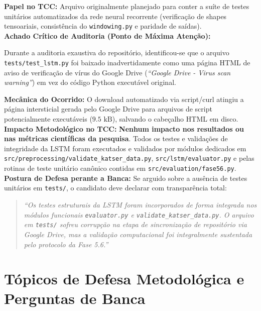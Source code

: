 \documentclass[10pt,a4paper]{article}
\begin{document}
\begin{filebox}
\textbf{Papel no TCC:} Arquivo originalmente planejado para conter a suíte de testes unitários automatizados da rede neural recorrente (verificação de shapes tensoariais, consistência do \texttt{windowing.py} e paridade de saídas).\\
\textbf{Achado Crítico de Auditoria (Ponto de Máxima Atenção):}
\begin{alertbox}
Durante a auditoria exaustiva do repositório, identificou-se que o arquivo \texttt{tests/test\_lstm.py} foi baixado inadvertidamente como uma página HTML de aviso de verificação de vírus do Google Drive (\textit{``Google Drive - Virus scan warning''}) em vez do código Python executável original.
\end{alertbox}
\textbf{Mecânica do Ocorrido:} O download automatizado via script/curl atingiu a página intersticial gerada pelo Google Drive para arquivos de script potencialmente executáveis ($9.5\text{ kB}$), salvando o cabeçalho HTML em disco.\\
\textbf{Impacto Metodológico no TCC:} \textbf{Nenhum impacto nos resultados ou nas métricas científicas da pesquisa}. Todos os testes e validações de integridade da LSTM foram executados e validados por módulos dedicados em \texttt{src/preprocessing/validate\_katser\_data.py}, \texttt{src/lstm/evaluator.py} e pelas rotinas de teste unitário canônico contidas em \texttt{src/evaluation/fase56.py}.\\
\textbf{Postura de Defesa perante a Banca:} Se arguido sobre a ausência de testes unitários em \texttt{tests/}, o candidato deve declarar com transparência total:
\begin{quote}
\textit{``Os testes estruturais da LSTM foram incorporados de forma integrada nos módulos funcionais \texttt{evaluator.py} e \texttt{validate\_katser\_data.py}. O arquivo em \texttt{tests/} sofreu corrupção na etapa de sincronização de repositório via Google Drive, mas a validação computacional foi integralmente sustentada pelo protocolo da Fase 5.6.''}
\end{quote}
\end{filebox}

\newpage
\section{Tópicos de Defesa Metodológica e Perguntas de Banca}
\end{document}
